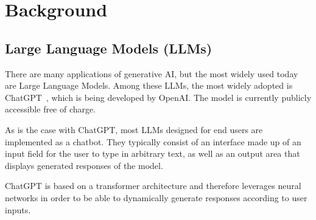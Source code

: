 \section{Background}
\label{sec:background}

\subsection{Large Language Models (LLMs)}
\label{subsec:large-language-models-(llms)}

There are many applications of generative AI, but the most widely used today are Large Language Models.
Among these LLMs, the most widely adopted is ChatGPT~\cite{openai_chatgpt_2023}, which is being
developed by OpenAI\@.
The model is currently publicly accessible free of charge. %

As is the case with ChatGPT, most LLMs designed for end users are implemented as a chatbot.
They typically consist of an interface made up of an input field for the user to type in arbitrary text, as well as
an output area that displays generated responses of the model.

ChatGPT is based on a transformer architecture %
and therefore leverages neural networks in order to be able to dynamically generate responses according
to user inputs.

